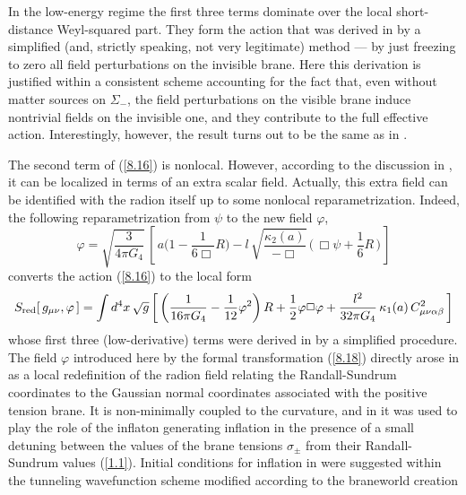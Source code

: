 \documentclass[a4paper,preprint,nofootinbib,
                 showpacs,preprintnumbers,amsmath,amssymb]{revtex4}
\begin{document}
In the low-energy regime the first three terms dominate over 
the local short-distance Weyl-squared part. They form the action that 
was derived in \cite{brane} by a simplified (and, strictly 
speaking, not very legitimate) method --- by just freezing to zero 
all field perturbations on the invisible brane. Here this 
derivation is justified within a consistent scheme accounting for 
the fact that, even without matter sources on $\Sigma_-$, the 
field perturbations on the visible brane induce nontrivial fields 
on the invisible one, and they contribute to the full effective 
action. Interestingly, however, the result turns out to be 
the same as in \cite{brane}. 
 
The second term of (\ref{8.16}) is nonlocal. However, according to 
the discussion in \cite{brane}, it can be localized in terms of an extra 
scalar field. Actually, this extra field can be identified with 
the radion itself up to some nonlocal reparametrization. Indeed, 
the following reparametrization from $\psi$ to the new field $\varphi$, 
    \begin{equation} 
    \varphi=\sqrt{\frac3{4\pi G_4}}\,\left[\,a\Big(1 
      -\frac1{6\Box}R\Big)- 
    l\,\sqrt{\frac{\kappa_2(a)}{-\Box}}\, 
    \Big(\,\Box\psi+\frac16 R\,\Big)\,\right]       \label{8.18} 
    \end{equation} 
converts the action (\ref{8.16}) to the local form  
    \begin{eqnarray} 
    S_{\rm red}[\,g_{\mu\nu},\varphi\,]= 
    \int d^4x\,\sqrt{g} 
    \left[\,\left(\frac1{16\pi G_4} 
     -\frac1{12} \varphi^2\right)R 
     +\frac12\varphi\Box\varphi 
     +\frac{l^2}{32\pi G_4}\,\kappa_1(a)\, 
    C_{\mu\nu\alpha\beta}^2\,\right]       \label{8.19} 
    \end{eqnarray} 
whose first three (low-derivative) terms were derived in  
\cite{brane} by a simplified procedure. 
The field $\varphi$ introduced here by the formal transformation 
(\ref{8.18}) directly arose in \cite{brane} as a local redefinition  
of the radion field relating the Randall-Sundrum coordinates to the 
Gaussian normal coordinates associated with the positive tension 
brane. It is non-minimally coupled to the curvature, and in 
\cite{brane} it was used to play the role of the inflaton 
generating inflation in the presence of a small detuning between the 
values of the brane tensions $\sigma_\pm$ from their Randall-Sundrum 
values (\ref{1.1}). Initial conditions for inflation in 
\cite{brane} were suggested within the tunneling wavefunction 
scheme \cite{tun} modified according to the braneworld creation 
\end{document}
